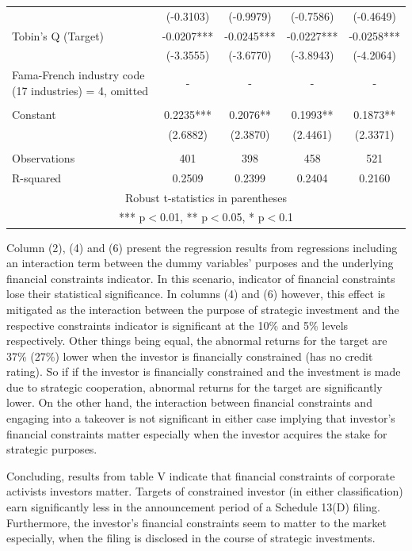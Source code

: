 \documentclass[12pt]{article}
\begin{document}
\begin{table}[ht]
\begin{adjustbox}{max width=\textwidth}
\begin{tabular}{lcccc}
			 & (-0.3103) & (-0.9979) & (-0.7586) & (-0.4649) \\
			Tobin's Q (Target) & -0.0207*** & -0.0245*** & -0.0227*** & -0.0258*** \\
			 & (-3.3555) & (-3.6770) & (-3.8943) & (-4.2064) \\
			Fama-French industry code (17 industries) = 4, omitted & - & - & - & - \\
			 &  &  &  &  \\
			Constant & 0.2235*** & 0.2076** & 0.1993** & 0.1873** \\
			 & (2.6882) & (2.3870) & (2.4461) & (2.3371) \\
			 &  &  &  &  \\
			Observations & 401 & 398 & 458 & 521 \\
			 R-squared & 0.2509 & 0.2399 & 0.2404 & 0.2160 \\ \hline
			\multicolumn{5}{c}{ Robust t-statistics in parentheses} \\
			\multicolumn{5}{c}{ *** p$<$0.01, ** p$<$0.05, * p$<$0.1} \\
			\end{tabular}			
	\end{adjustbox}
\end{table}

Column (2), (4) and (6) present the regression results from regressions including an interaction term between the dummy variables' purposes and the underlying financial constraints indicator. In this scenario, indicator of financial constraints lose their statistical significance. In columns (4) and (6) however, this effect is mitigated as the interaction between the purpose of strategic investment and the respective constraints indicator is significant at the 10\% and 5\% levels respectively. Other things being equal, the abnormal returns for the target are 37\% (27\%) lower when the investor is financially constrained (has no credit rating). So if if the investor is financially constrained and the investment is made due to strategic cooperation, abnormal returns for the target are significantly lower. On the other hand, the interaction between financial constraints and engaging into a takeover is not significant in either case implying that investor's financial constraints matter especially when the investor acquires the stake for strategic purposes. 

Concluding, results from table V indicate that financial constraints of corporate activists investors matter. Targets of constrained investor (in either classification) earn significantly less in the announcement period of a Schedule 13(D) filing. Furthermore, the investor's financial constraints seem to matter to the market especially, when the filing is disclosed in the course of strategic investments. 
\end{document}
